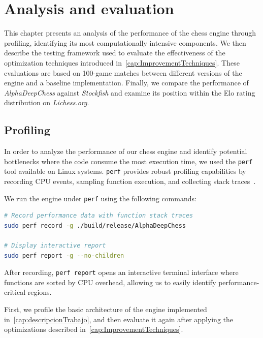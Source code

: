 \chapter{Analysis and evaluation}\label{cap:analysis}

This chapter presents an analysis of the performance of the chess engine through profiling, identifying its most computationally intensive components. We then describe the testing framework used to evaluate the effectiveness of the optimization techniques introduced in~\cref{cap:ImprovementTechniques}. These evaluations are based on 100-game matches between different versions of the engine and a baseline implementation. Finally, we compare the performance of \textit{AlphaDeepChess} against \textit{Stockfish} and examine its position within the Elo rating distribution on \textit{Lichess.org}.

\section{Profiling}
In order to analyze the performance of our chess engine and identify potential bottlenecks where the code consume the most execution time, we used the \texttt{perf} tool available on Linux systems. \texttt{perf} provides robust profiling capabilities by recording CPU events, sampling function execution, and collecting stack traces~\cite{PerfLinux}. 

\vspace{1em}

\noindent We run the engine under \texttt{perf} using the following commands:

\begin{lstlisting}[language=bash, caption={Profiling \textit{AlphaDeepChess} with perf}, frame=single, breaklines=true, captionpos=b]
# Record performance data with function stack traces
sudo perf record -g ./build/release/AlphaDeepChess

# Display interactive report
sudo perf report -g --no-children
\end{lstlisting}

\noindent After recording, \texttt{perf report} opens an interactive terminal interface where functions are sorted by CPU overhead, allowing us to easily identify performance-critical regions.

\vspace{1em}

\noindent First, we profile the basic architecture of the engine implemented in~\cref{cap:descripcionTrabajo}, and then evaluate it again after applying the optimizations described in~\cref{cap:ImprovementTechniques}.

